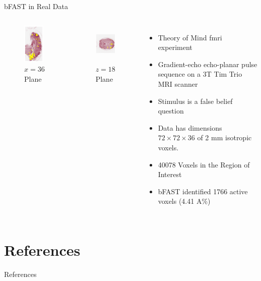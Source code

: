 \documentclass{beamer}
\begin{document}
\begin{frame}{bFAST in Real Data}
\begin{columns}

\begin{figure}
\centering
\includegraphics[angle=90,height=0.75in]{Images/realDataYZ.png}
\caption{$x=36$ Plane}
\end{figure}

\begin{figure}
\centering
\includegraphics[height=0.75in]{Images/realDataXY.png}
\caption{$z=18$ Plane}
\end{figure}

\begin{itemize}
\item Theory of Mind \gls{fmri} experiment
\item Gradient-echo echo-planar pulse sequence on a 3T Tim Trio MRI scanner
\item Stimulus is a false belief question
\item Data has dimensions $72\times72\times36$ of 2 mm isotropic voxels.
\item 40078 Voxels in the Region of Interest
\item bFAST identified 1766 active voxels (4.41 A\%)
\end{itemize}

\end{columns}
\end{frame}

\section{References}

\begin{frame}[allowframebreaks]{References}

\end{frame}

\end{document}
